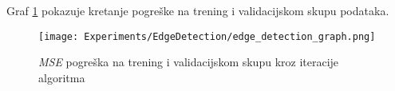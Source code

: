 Graf \ref{fig:edge_detection_graph} pokazuje kretanje pogreške na trening i validacijskom skupu podataka.

\begin{figure}
	\centering
	\caption{\emph{MSE} pogreška na trening i validacijskom skupu kroz iteracije algoritma}
	\texttt{[image: Experiments/EdgeDetection/edge\_detection\_graph.png]}
	\label{fig:edge_detection_graph}
\end{figure}
